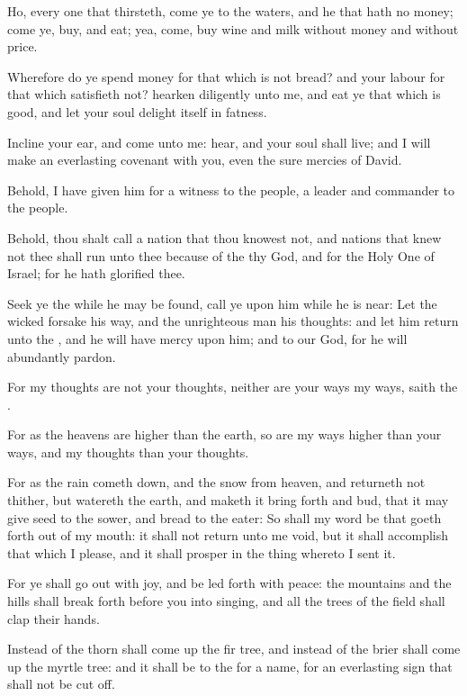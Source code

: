 \Chapter
\Verse Ho, every one that thirsteth, come ye to the waters, and he that hath no money; come ye, buy, and eat; yea, come, buy wine and milk without money and without price.

\Verse Wherefore do ye spend money for that which is not bread? and your labour for that which satisfieth not? hearken diligently unto me, and eat ye that which is good, and let your soul delight itself in fatness.

\Verse Incline your ear, and come unto me: hear, and your soul shall live; and I will make an everlasting covenant with you, even the sure mercies of David.

\Verse Behold, I have given him for a witness to the people, a leader and commander to the people.

\Verse Behold, thou shalt call a nation that thou knowest not, and nations that knew not thee shall run unto thee because of the \LORD thy God, and for the Holy One of Israel; for he hath glorified thee.

\Verse Seek ye the \LORD while he may be found, call ye upon him while he is near: \Verse Let the wicked forsake his way, and the unrighteous man his thoughts: and let him return unto the \LORD, and he will have mercy upon him; and to our God, for he will abundantly pardon.

\Verse For my thoughts are not your thoughts, neither are your ways my ways, saith the \LORD.

\Verse For as the heavens are higher than the earth, so are my ways higher than your ways, and my thoughts than your thoughts.

\Verse For as the rain cometh down, and the snow from heaven, and returneth not thither, but watereth the earth, and maketh it bring forth and bud, that it may give seed to the sower, and bread to the eater: \Verse So shall my word be that goeth forth out of my mouth: it shall not return unto me void, but it shall accomplish that which I please, and it shall prosper in the thing whereto I sent it.

\Verse For ye shall go out with joy, and be led forth with peace: the mountains and the hills shall break forth before you into singing, and all the trees of the field shall clap their hands.

\Verse Instead of the thorn shall come up the fir tree, and instead of the brier shall come up the myrtle tree: and it shall be to the \LORD for a name, for an everlasting sign that shall not be cut off.


